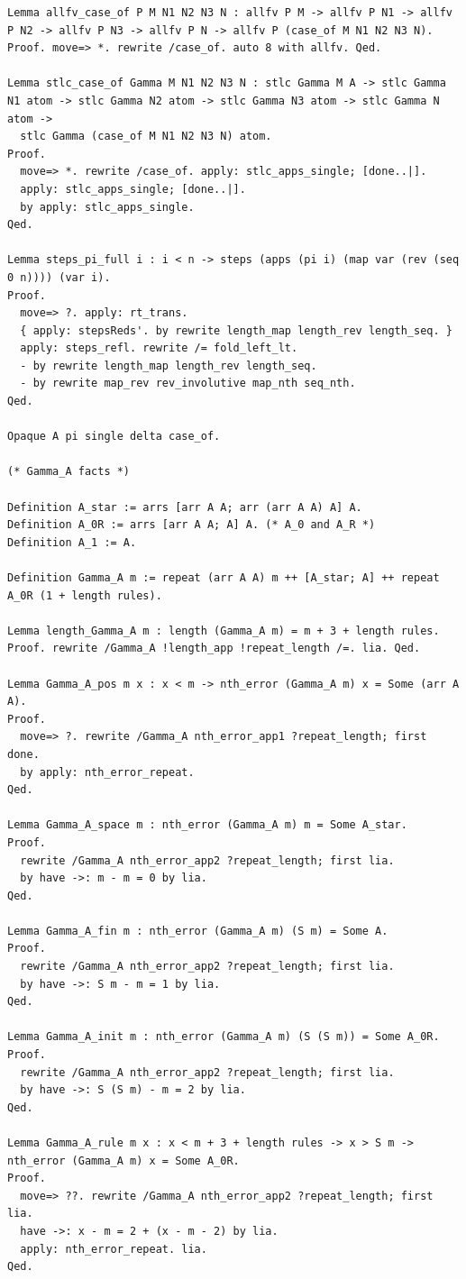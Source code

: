 \begin{lstlisting}
Lemma allfv_case_of P M N1 N2 N3 N : allfv P M -> allfv P N1 -> allfv P N2 -> allfv P N3 -> allfv P N -> allfv P (case_of M N1 N2 N3 N).
Proof. move=> *. rewrite /case_of. auto 8 with allfv. Qed.

Lemma stlc_case_of Gamma M N1 N2 N3 N : stlc Gamma M A -> stlc Gamma N1 atom -> stlc Gamma N2 atom -> stlc Gamma N3 atom -> stlc Gamma N atom ->
  stlc Gamma (case_of M N1 N2 N3 N) atom.
Proof.
  move=> *. rewrite /case_of. apply: stlc_apps_single; [done..|].
  apply: stlc_apps_single; [done..|].
  by apply: stlc_apps_single.
Qed.

Lemma steps_pi_full i : i < n -> steps (apps (pi i) (map var (rev (seq 0 n)))) (var i).
Proof.
  move=> ?. apply: rt_trans.
  { apply: stepsReds'. by rewrite length_map length_rev length_seq. }
  apply: steps_refl. rewrite /= fold_left_lt.
  - by rewrite length_map length_rev length_seq.
  - by rewrite map_rev rev_involutive map_nth seq_nth.
Qed.

Opaque A pi single delta case_of.

(* Gamma_A facts *)

Definition A_star := arrs [arr A A; arr (arr A A) A] A.
Definition A_0R := arrs [arr A A; A] A. (* A_0 and A_R *)
Definition A_1 := A.

Definition Gamma_A m := repeat (arr A A) m ++ [A_star; A] ++ repeat A_0R (1 + length rules).

Lemma length_Gamma_A m : length (Gamma_A m) = m + 3 + length rules.
Proof. rewrite /Gamma_A !length_app !repeat_length /=. lia. Qed.

Lemma Gamma_A_pos m x : x < m -> nth_error (Gamma_A m) x = Some (arr A A).
Proof.
  move=> ?. rewrite /Gamma_A nth_error_app1 ?repeat_length; first done.
  by apply: nth_error_repeat.
Qed.

Lemma Gamma_A_space m : nth_error (Gamma_A m) m = Some A_star.
Proof.
  rewrite /Gamma_A nth_error_app2 ?repeat_length; first lia.
  by have ->: m - m = 0 by lia.
Qed.

Lemma Gamma_A_fin m : nth_error (Gamma_A m) (S m) = Some A.
Proof.
  rewrite /Gamma_A nth_error_app2 ?repeat_length; first lia.
  by have ->: S m - m = 1 by lia.
Qed.

Lemma Gamma_A_init m : nth_error (Gamma_A m) (S (S m)) = Some A_0R.
Proof.
  rewrite /Gamma_A nth_error_app2 ?repeat_length; first lia.
  by have ->: S (S m) - m = 2 by lia.
Qed.

Lemma Gamma_A_rule m x : x < m + 3 + length rules -> x > S m -> nth_error (Gamma_A m) x = Some A_0R.
Proof.
  move=> ??. rewrite /Gamma_A nth_error_app2 ?repeat_length; first lia.
  have ->: x - m = 2 + (x - m - 2) by lia.
  apply: nth_error_repeat. lia.
Qed.


\end{lstlisting}
